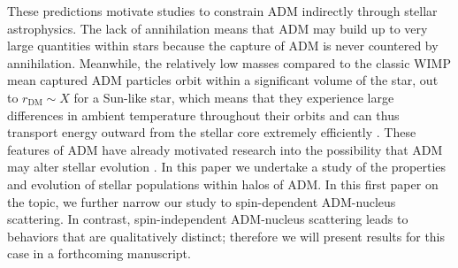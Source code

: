 \documentclass[useAMS,usenatbib]{mnras}
\begin{document}
  These predictions motivate studies to
  constrain ADM indirectly through stellar astrophysics. The lack of
  annihilation means that ADM may build up to very large
  quantities within stars because the capture of ADM is never countered
  by annihilation. Meanwhile, the relatively low masses
  compared to the classic WIMP mean captured ADM particles orbit within
  a significant volume of the star, out to $r_{\mathrm{DM}} \sim X$ 
  for a Sun-like star, which means that they experience large differences
  in ambient temperature
  throughout their orbits and can thus transport energy outward from the
  stellar core extremely efficiently \citep{Spergel1985EffectInterior}.
  These features of ADM have already motivated research into the possibility that
  ADM may alter stellar evolution
  \citep[e.g.][]{Zentner2011AsymmetricDwarfs,iocco_etal12,vincent_etal15}.
  In this paper we undertake a study of the properties and evolution of
  stellar populations within halos of ADM. In this first paper on the topic,
  we further narrow our study to spin-dependent ADM-nucleus scattering.
  In contrast, spin-independent ADM-nucleus scattering leads to behaviors that are
  qualitatively distinct; therefore we will
  present results for this case in a forthcoming manuscript.

\end{document}
